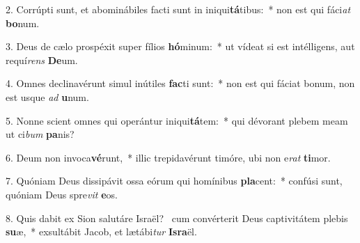 2. Corrúpti sunt, et abominábiles facti sunt in iniqui\textbf{tá}tibus:~*  non est qui fáci\textit{at} \textbf{bo}num.\

3. Deus de cælo prospéxit super fílios \textbf{hó}minum:~*  ut vídeat si est intélligens, aut requí\textit{rens} \textbf{De}um.\

4. Omnes declinavérunt simul inútiles \textbf{fac}ti sunt:~*  non est qui fáciat bonum, non est usque \textit{ad} \textbf{u}num.\

5. Nonne scient omnes qui operántur iniqui\textbf{tá}tem:~*  qui dévorant plebem meam ut ci\textit{bum} \textbf{pa}nis?\

6. Deum non invoca\textbf{vé}runt,~*  illic trepidavérunt timóre, ubi non e\textit{rat} \textbf{ti}mor.\

7. Quóniam Deus dissipávit ossa eórum qui homínibus \textbf{pla}cent:~*  confúsi sunt, quóniam Deus spre\textit{vit} \textbf{e}os.\

8. Quis dabit ex Sion salutáre Israël? \dag\  cum convérterit Deus captivitátem plebis \textbf{su}æ,~*  exsultábit Jacob, et lætábi\textit{tur} \textbf{Is}\textbf{ra}ël.\

